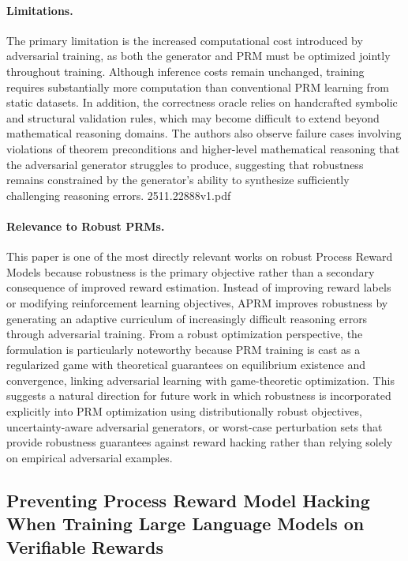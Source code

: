 \documentclass[11pt]{article}
\begin{document}
\paragraph{Limitations.}
The primary limitation is the increased computational cost introduced by adversarial training, as both the generator and PRM must be optimized jointly throughout training. Although inference costs remain unchanged, training requires substantially more computation than conventional PRM learning from static datasets. In addition, the correctness oracle relies on handcrafted symbolic and structural validation rules, which may become difficult to extend beyond mathematical reasoning domains. The authors also observe failure cases involving violations of theorem preconditions and higher-level mathematical reasoning that the adversarial generator struggles to produce, suggesting that robustness remains constrained by the generator's ability to synthesize sufficiently challenging reasoning errors. 2511.22888v1.pdf

\paragraph{Relevance to Robust PRMs.}
This paper is one of the most directly relevant works on robust Process Reward Models because robustness is the primary objective rather than a secondary consequence of improved reward estimation. Instead of improving reward labels or modifying reinforcement learning objectives, APRM improves robustness by generating an adaptive curriculum of increasingly difficult reasoning errors through adversarial training. From a robust optimization perspective, the formulation is particularly noteworthy because PRM training is cast as a regularized game with theoretical guarantees on equilibrium existence and convergence, linking adversarial learning with game-theoretic optimization. This suggests a natural direction for future work in which robustness is incorporated explicitly into PRM optimization using distributionally robust objectives, uncertainty-aware adversarial generators, or worst-case perturbation sets that provide robustness guarantees against reward hacking rather than relying solely on empirical adversarial examples.

\subsection{Preventing Process Reward Model Hacking When Training Large Language Models on Verifiable Rewards}
\end{document}
